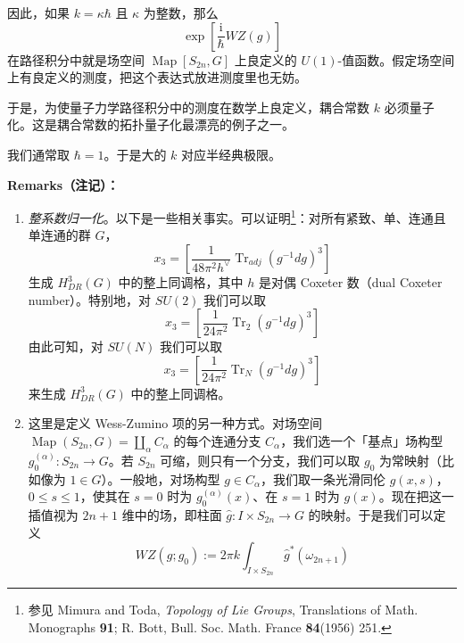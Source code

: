 因此，如果 $k=\kappa\hbar$ 且 $\kappa$ 为整数，那么
\begin{equation}
  \exp\left[\frac{\mathrm{i}}{\hbar}WZ(g)\right]
  \tag{4.17}
  \label{eq:4.17}
\end{equation}
在路径积分中就是场空间 $\operatorname{Map}[S_{2n},G]$ 上良定义的 $U(1)$-值函数。假定场空间上有良定义的测度，把这个表达式放进测度里也无妨。

于是，为使量子力学路径积分中的测度在数学上良定义，耦合常数 $k$ 必须量子化。这是耦合常数的拓扑量子化最漂亮的例子之一。

我们通常取 $\hbar=1$。于是大的 $k$ 对应半经典极限。

\textbf{Remarks（注记）：}

\begin{enumerate}
  \item \emph{整系数归一化}。以下是一些相关事实。可以证明\footnote{参见 Mimura and Toda, \emph{Topology of Lie Groups}, Translations of Math. Monographs \textbf{91}; R. Bott, Bull. Soc. Math. France \textbf{84}(1956) 251.}：对所有紧致、单、连通且单连通的群 $G$，
  \begin{equation}
    x_3=\left[\frac{1}{48\pi^2h^\vee}\operatorname{Tr}_{adj}(g^{-1}dg)^3\right]
    \tag{4.18}
    \label{eq:4.18}
  \end{equation}
  生成 $H^3_{DR}(G)$ 中的整上同调格，其中 $h$ 是对偶 Coxeter 数（dual Coxeter number）。特别地，对 $SU(2)$ 我们可以取
  \begin{equation}
    x_3=\left[\frac{1}{24\pi^2}\operatorname{Tr}_2(g^{-1}dg)^3\right]
    \tag{4.19}
    \label{eq:4.19}
  \end{equation}
  由此可知，对 $SU(N)$ 我们可以取
  \begin{equation}
    x_3=\left[\frac{1}{24\pi^2}\operatorname{Tr}_N(g^{-1}dg)^3\right]
    \tag{4.20}
    \label{eq:4.20}
  \end{equation}
  来生成 $H^3_{DR}(G)$ 中的整上同调格。

  \item 这里是定义 Wess-Zumino 项的另一种方式。对场空间 $\operatorname{Map}(S_{2n},G)=\coprod_{\alpha}C_{\alpha}$ 的每个连通分支 $C_{\alpha}$，我们选一个「基点」场构型 $g_0^{(\alpha)}:S_{2n}\to G$。若 $S_{2n}$ 可缩，则只有一个分支，我们可以取 $g_0$ 为常映射（比如像为 $1\in G$）。一般地，对场构型 $g\in C_{\alpha}$，我们取一条光滑同伦 $g(x,s)$，$0\le s\le1$，使其在 $s=0$ 时为 $g_0^{(\alpha)}(x)$、在 $s=1$ 时为 $g(x)$。现在把这一插值视为 $2n+1$ 维中的场，即柱面 $\hat g:I\times S_{2n}\to G$ 的映射。于是我们可以定义
  \begin{equation}
    WZ(g;g_0):=2\pi k\int_{I\times S_{2n}}\hat g^*(\omega_{2n+1})
    \tag{4.21}
    \label{eq:4.21}
  \end{equation}


\end{enumerate}
